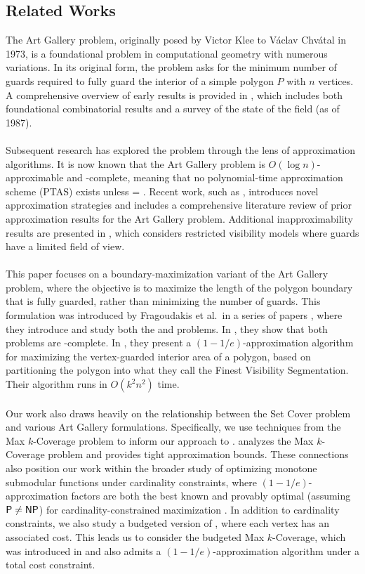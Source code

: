 \subsection{Related Works}
The Art Gallery problem, originally posed by Victor Klee to Václav Chvátal in 1973, is a foundational problem in computational geometry with numerous variations. In its original form, the problem asks for the minimum number of guards required to fully guard the interior of a simple polygon $P$ with $n$ vertices. A comprehensive overview of early results is provided in \cite{orourke-artgallery}, which includes both foundational combinatorial results and a survey of the state of the field (as of 1987).\\\\
Subsequent research has explored the problem through the lens of approximation algorithms. It is now known that the Art Gallery problem is $O(\log n)$-approximable and -complete, meaning that no polynomial-time approximation scheme (PTAS) exists unless  = . Recent work, such as \cite{das-robustly}, introduces novel approximation strategies and includes a comprehensive literature review of prior approximation results for the Art Gallery problem. Additional inapproximability results are presented in \cite{abdelkader}, which considers restricted visibility models where guards have a limited field of view.\\\\
This paper focuses on a boundary-maximization variant of the Art Gallery problem, where the objective is to maximize the length of the polygon boundary that is fully guarded, rather than minimizing the number of guards. This formulation was introduced by Fragoudakis et al.\ in a series of papers \cite{fragoudakis-interior, fragoudakis-boundary, fragoudakis-paintings}, where they introduce and study both the \MLVG{} and \MVVG{} problems. In \cite{fragoudakis-boundary}, they show that both problems are -complete. In \cite{fragoudakis-interior}, they present a $(1-1/e)$-approximation algorithm for maximizing the vertex-guarded interior area of a polygon, based on partitioning the polygon into what they call the Finest Visibility Segmentation. Their algorithm runs in $O(k^2n^2)$ time.\\\\
Our work also draws heavily on the relationship between the Set Cover problem and various Art Gallery formulations. Specifically, we use techniques from the Max $k$-Coverage problem to inform our approach to \MLVG{}. \cite{hochbaum-maxkcover} analyzes the Max $k$-Coverage problem and provides tight approximation bounds. These connections also position our work within the broader study of optimizing monotone submodular functions under cardinality constraints, where $(1-1/e)$-approximation factors are both the best known and provably optimal (assuming $\textnormal{\textsf{P}}\neq\textnormal{\textsf{NP}}$) for cardinality-constrained maximization \cite{cornuejols,feige}.
In addition to cardinality constraints, we also study a budgeted version of \MVVG{}, where each vertex has an associated cost. This leads us to consider the budgeted Max $k$-Coverage, which was introduced in \cite{khuller} and also admits a $(1-1/e)$-approximation algorithm under a total cost constraint.

